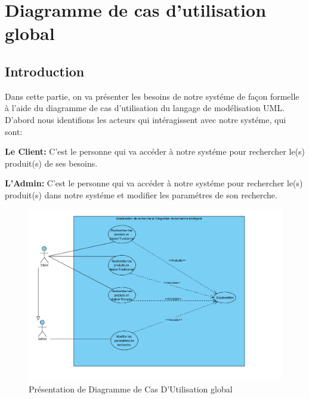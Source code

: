 \section{Diagramme de cas d’utilisation global}
\subsection{Introduction}
\noindent
Dans cette partie, on va présenter les besoins de notre systéme de façon formelle à l'aide du diagramme de cas d'utilisation du langage de modélisation UML. D'abord nous identifions les acteurs qui intéragissent avec notre systéme, qui sont:

\noindent
\small\textbf{Le Client: } C'est le personne qui va accéder à notre systéme pour rechercher le(s) produit(s) de ses besoins. 

\noindent
\small\textbf{L'Admin: } C'est le personne qui va accéder à notre systéme pour rechercher le(s) produit(s) dans notre systéme et modifier les paramétres de son recherche. 

\begin{figure}[H]
\centering
\includegraphics[width=1\textwidth]{logos/CU_global.png}
\caption{Présentation de Diagramme de Cas D'Utilisation global}
\label{fig:diagcuglobal}
\end{figure}